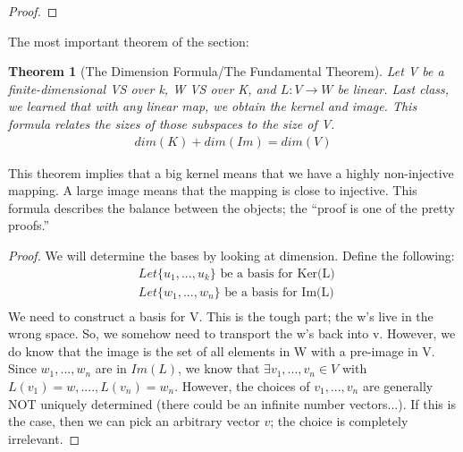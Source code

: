 \documentclass[a4paper, 12pt]{article}
\newtheorem{theorem}{Theorem}
\theoremstyle{definition}
\theoremstyle{definition}
\theoremstyle{definition}
\theoremstyle{definition}
\begin{document}
{\begin{proof}
\end{proof}

The most important theorem of the section: 
\begin{theorem}[The Dimension Formula/The Fundamental Theorem]

Let V be a finite-dimensional VS over k, W VS over K, and $L: V \rightarrow W$ be linear. Last class, we learned that with any linear map, we obtain the kernel and image. This formula relates the sizes of those subspaces to the size of V. 
\begin{align}
	dim(K) + dim(Im) = dim(V)
\end{align}
	
\end{theorem}
This theorem implies that a big kernel means that we have a highly non-injective mapping. A large image means that the mapping is close to injective. This formula describes the balance between the objects; the ``proof is one of the pretty proofs.'' 

\begin{proof}
	We will determine the bases by looking at dimension. Define the following: 
	\begin{align*}
		& Let \{ u_1, ..., u_k  \} \mbox{ be a basis for Ker(L)} \\
		& Let \{ w_1, ..., w_n \} \mbox{ be a basis for Im(L) } \\ 
	\end{align*}
	We need to construct a basis for V. This is the tough part; the w's live in the wrong space. So, we somehow need to transport the w's back into v. However, we do know that the image is the set of all elements in W with a pre-image in V. 
	\newline
	\newline
	Since $w_1,...,w_n$ are in $Im(L)$, we know that $\exists v_1, ..., v_n \in V$ with $L(v_1) = w, ...., L(v_n) = w_n$. However, the choices of $v_1, ..., v_n$ are generally NOT uniquely determined (there could be an infinite number vectors...). If this is the case, then we can pick an arbitrary vector $v$; the choice is completely irrelevant. 
	

\end{proof}}
\end{document}
